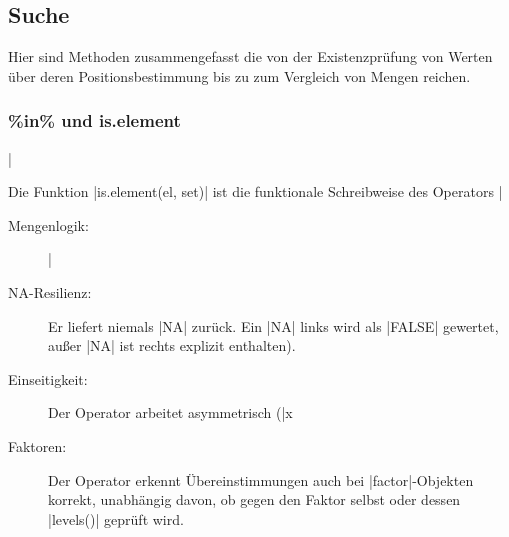 \documentclass[10pt,twocolumn]{scrartcl}
\renewcommand{\lstinline}{\mycoloredinline}
\begin{document}
\subsection{Suche}

Hier sind Methoden zusammengefasst die von der Existenzprüfung von Werten über deren Positionsbestimmung bis zu zum Vergleich von Mengen reichen.


\subsubsection{\%in\% und is.element}

\lstinline|%in%| prüft für jedes Element des linken Operanden, ob es in der Menge des rechten Operanden enthalten ist. Das Ergebnis ist ein logischer Vektor von der Länge des linken Operanden. Eine schneller Variante ist \lstinline|fastmatch::%fin%|.

Die Funktion \lstinline|is.element(el, set)| ist die funktionale Schreibweise des Operators \lstinline|%in%|.

\begin{description}
\item[Mengenlogik:] \lstinline|%in%| führt einen exakten Abgleich durch. Duplikate im rechten Operanden spielen keine Rolle. Für Teilstring-Suchen ist der Operator nicht geeignet. Hierfür sind \lstinline|grep()| oder \lstinline|grepl()| zu nutzen.
\item[NA-Resilienz:] Er liefert niemals \lstinline|NA| zurück. Ein \lstinline|NA| links wird als \lstinline|FALSE| gewertet, außer \lstinline|NA| ist rechts explizit enthalten).
\item[Einseitigkeit:] Der Operator arbeitet asymmetrisch (\lstinline|x %in% y| ist nicht gleich \lstinline|y %in% x|). Es wird stets nur die Zugehörigkeit der linken Elemente zur rechten Menge bestimmt.
\item[Faktoren:] Der Operator erkennt Übereinstimmungen auch bei \lstinline|factor|-Objekten korrekt, unabhängig davon, ob gegen den Faktor selbst oder dessen \lstinline|levels()| geprüft wird.
\end{description}
\end{document}
